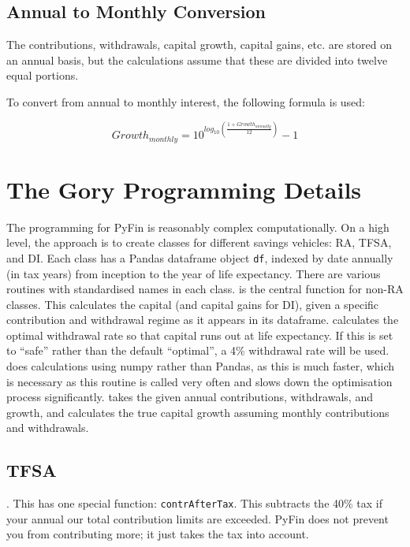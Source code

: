 \documentclass[a4paper, justified]{tufte-handout}
\begin{document}
\subsection{Annual to Monthly Conversion}
The contributions, withdrawals, capital growth, capital gains, etc. are stored on an annual basis, but the calculations assume that these are divided into twelve equal portions.

To convert from annual to monthly interest, the following formula is used:

\begin{equation}
Growth_{monthly} = 10^{log_{10}\left(\frac{1 +Growth_{annually}}{12}\right)} - 1
\end{equation}

\newpage
\section{The Gory Programming Details}
The programming for PyFin is reasonably complex computationally. On a high level, the approach is to create classes for different savings vehicles: RA, TFSA, and DI. Each class has a Pandas dataframe object \texttt{df}, indexed by date annually (in tax years) from inception to the year of life expectancy. There are various routines with standardised names in each class.
 is the central function for non-RA classes. This calculates the capital (and capital gains for DI), given a specific contribution and withdrawal regime as it appears in its dataframe.
 calculates the optimal withdrawal rate so that capital runs out at life expectancy. If this is set to ``safe'' rather than the default ``optimal'', a 4\% withdrawal rate will be used.
 does calculations using numpy rather than Pandas, as this is much faster, which is necessary as this routine is called very often and slows down the optimisation process significantly.
 takes the given annual contributions, withdrawals, and growth, and calculates the true capital growth assuming monthly contributions and withdrawals.

\subsection{TFSA}. This has one special function: \texttt{contrAfterTax}. This subtracts the 40\% tax if your annual our total contribution limits are exceeded. PyFin does not prevent you from contributing more; it just takes the tax into account. 
\end{document}
